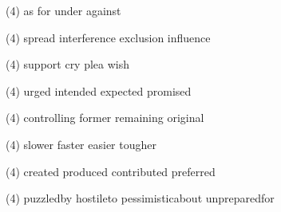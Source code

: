 \begin{tasks}(4)
	\task as
	\task for
	\task under
	\task against
\end{tasks}
\item
\begin{tasks}(4)
	\task spread
	\task interference
	\task exclusion
	\task influence
\end{tasks}
\item
\begin{tasks}(4)
	\task support
	\task cry
	\task plea
	\task wish
\end{tasks}
\item
\begin{tasks}(4)
	\task urged
	\task intended
	\task expected
	\task promised
\end{tasks}
\item
\begin{tasks}(4)
	\task controlling
	\task former
	\task remaining
	\task original
\end{tasks}
\item
\begin{tasks}(4)
	\task slower
	\task faster
	\task easier
	\task tougher
\end{tasks}
\item
\begin{tasks}(4)
	\task created
	\task produced
	\task contributed
	\task preferred
\end{tasks}
\item
\begin{tasks}(4)
	\task puzzledby
	\task hostileto
	\task pessimisticabout
	\task unpreparedfor
\end{tasks}
